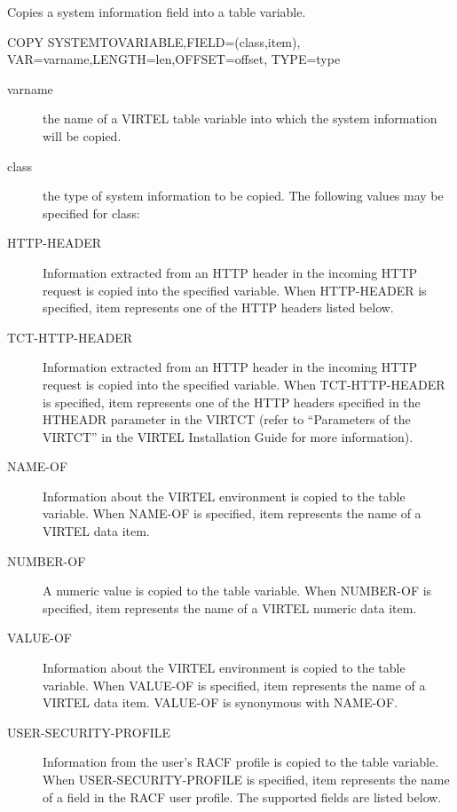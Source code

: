 \documentclass[letterpaper,10pt,english]{sphinxmanual}
\begin{document}

Copies a system information field into a table variable.

\begin{sphinxVerbatim}[commandchars=\\\{\}]
COPY\PYGZdl{} SYSTEM\PYGZhy{}TO\PYGZhy{}VARIABLE,FIELD=(class,item),
VAR=\PYGZsq{}varname\PYGZsq{},LENGTH=len,OFFSET=offset,
TYPE=type
\end{sphinxVerbatim}
\begin{description}
\item[{varname}] \leavevmode
the name of a VIRTEL table variable into which the system information will be copied.

\item[{class}] \leavevmode
the type of system information to be copied. The following values may be specified for class:

\item[{HTTP-HEADER}] \leavevmode
Information extracted from an HTTP header in the incoming HTTP request is copied into the specified variable. When HTTP-HEADER is specified, item represents one of the HTTP headers listed below.

\item[{TCT-HTTP-HEADER}] \leavevmode
Information extracted from an HTTP header in the incoming HTTP request is copied into the specified variable. When TCT-HTTP-HEADER is specified, item represents one of the HTTP headers specified in the HTHEADR parameter in the VIRTCT (refer to “Parameters of the VIRTCT” in the VIRTEL Installation Guide for more information).

\item[{NAME-OF}] \leavevmode
Information about the VIRTEL environment is copied to the table variable. When NAME-OF is specified, item represents the name of a VIRTEL data item.

\item[{NUMBER-OF}] \leavevmode
A numeric value is copied to the table variable. When NUMBER-OF is specified, item represents the name of a VIRTEL numeric data item.

\item[{VALUE-OF}] \leavevmode
Information about the VIRTEL environment is copied to the table variable. When VALUE-OF is specified, item represents the name of a VIRTEL data item. VALUE-OF is synonymous with NAME-OF.

\item[{USER-SECURITY-PROFILE}] \leavevmode
Information from the user’s RACF profile is copied to the table variable. When USER-SECURITY-PROFILE is specified, item represents the name of a field in the RACF user profile. The supported fields are listed below.


\end{description}
\end{document}
